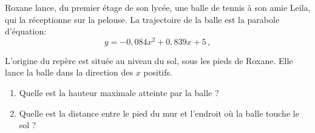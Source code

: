 \begin{exo}
	Roxane lance, du premier étage de son lycée, une balle de tennis à son amie Leila, qui la réceptionne sur la pelouse. La trajectoire de la balle est la parabole d'équation: \[y=-0,084x^2+0,839x+5 \,,\]

\label{roxane}	
	
	L'origine du repère est située au niveau du sol, sous les pieds de Roxane. Elle lance la balle dans la direction des $x$ positifs.
	

	\begin{enumerate}
		\item Quelle est la hauteur maximale atteinte par la balle ?
		\item Quelle est la distance entre le pied du mur et l'endroit où la balle touche le sol ?
	\end{enumerate}
\end{exo}





